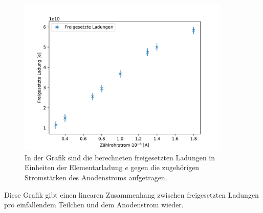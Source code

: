 \documentclass[titlepage = firstcover]{scrartcl}
\begin{document}
            \FloatBarrier

                 \begin{figure}[h]
                   \centering
                   \includegraphics[width = 0.9\textwidth]{Ladungen.pdf}
                   \caption{In der Grafik sind die berechneten freigesetzten Ladungen in Einheiten der Elementarladung $e$ gegen die zugehörigen Stromstärken des Anodenstroms aufgetragen.}
                   \label{fig:Ladungen}
                 \end{figure}
             
            \FloatBarrier

            \noindent
            Diese Grafik gibt einen linearen Zusammenhang zwischen freigesetzten Ladungen pro einfallendem Teilchen und dem Anodenstrom wieder.

        \newpage
\end{document}
